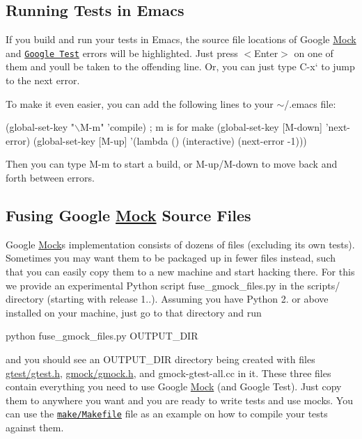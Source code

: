 \subsection*{Running Tests in Emacs}

If you build and run your tests in Emacs, the source file locations of Google \hyperlink{classMock}{Mock} and \href{../../googletest/}{\tt Google Test} errors will be highlighted. Just press {\ttfamily $<$Enter$>$} on one of them and you\textquotesingle{}ll be taken to the offending line. Or, you can just type {\ttfamily C-\/x}` to jump to the next error.

To make it even easier, you can add the following lines to your {\ttfamily $\sim$/.emacs} file\+:


\begin{DoxyCode}
(global-set-key "\(\backslash\)M-m"   'compile)  ; m is for make
(global-set-key [M-down] 'next-error)
(global-set-key [M-up]   '(lambda () (interactive) (next-error -1)))
\end{DoxyCode}


Then you can type {\ttfamily M-\/m} to start a build, or {\ttfamily M-\/up}/{\ttfamily M-\/down} to move back and forth between errors.

\subsection*{Fusing Google \hyperlink{classMock}{Mock} Source Files}

Google \hyperlink{classMock}{Mock}\textquotesingle{}s implementation consists of dozens of files (excluding its own tests). Sometimes you may want them to be packaged up in fewer files instead, such that you can easily copy them to a new machine and start hacking there. For this we provide an experimental Python script {\ttfamily fuse\+\_\+gmock\+\_\+files.\+py} in the {\ttfamily scripts/} directory (starting with release 1..). Assuming you have Python 2. or above installed on your machine, just go to that directory and run 
\begin{DoxyCode}
python fuse\_gmock\_files.py OUTPUT\_DIR
\end{DoxyCode}


and you should see an {\ttfamily O\+U\+T\+P\+U\+T\+\_\+\+D\+IR} directory being created with files {\ttfamily \hyperlink{gtest_8h_source}{gtest/gtest.\+h}}, {\ttfamily \hyperlink{gmock_8h_source}{gmock/gmock.\+h}}, and {\ttfamily gmock-\/gtest-\/all.\+cc} in it. These three files contain everything you need to use Google \hyperlink{classMock}{Mock} (and Google Test). Just copy them to anywhere you want and you are ready to write tests and use mocks. You can use the \href{../make/Makefile}{\tt make/\+Makefile} file as an example on how to compile your tests against them.

